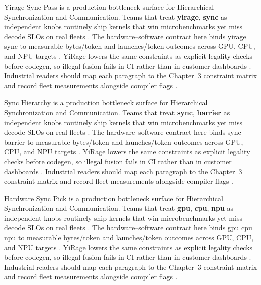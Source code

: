 Yirage Sync Pass is a production bottleneck surface for Hierarchical Synchronization and Communication. Teams that treat \textbf{yirage}, \textbf{sync} as independent knobs routinely ship kernels that win microbenchmarks yet miss decode SLOs on real fleets \citep{liu2024deepseekv3,memoryfloor2026}. The hardware--software contract here binds yirage sync to measurable bytes/token and launches/token outcomes across GPU, CPU, and NPU targets \citep{patel2025llminference,nvidia2022hopper}. YiRage lowers the same constraints as explicit legality checks before codegen, so illegal fusion fails in CI rather than in customer dashboards \citep{taxbreak2026,semianalysis2024tma}. Industrial readers should map each paragraph to the Chapter~3 constraint matrix and record fleet measurements alongside compiler flags \citep{memoryfloor2026,amd2024xdna}.

Sync Hierarchy is a production bottleneck surface for Hierarchical Synchronization and Communication. Teams that treat \textbf{sync}, \textbf{barrier} as independent knobs routinely ship kernels that win microbenchmarks yet miss decode SLOs on real fleets \citep{patel2025llminference,nvidia2022hopper}. The hardware--software contract here binds sync barrier to measurable bytes/token and launches/token outcomes across GPU, CPU, and NPU targets \citep{taxbreak2026,semianalysis2024tma}. YiRage lowers the same constraints as explicit legality checks before codegen, so illegal fusion fails in CI rather than in customer dashboards \citep{memoryfloor2026,amd2024xdna}. Industrial readers should map each paragraph to the Chapter~3 constraint matrix and record fleet measurements alongside compiler flags \citep{nvidia2022hopper,amd2024aie}.

Hardware Sync Pick is a production bottleneck surface for Hierarchical Synchronization and Communication. Teams that treat \textbf{gpu}, \textbf{cpu}, \textbf{npu} as independent knobs routinely ship kernels that win microbenchmarks yet miss decode SLOs on real fleets \citep{taxbreak2026,semianalysis2024tma}. The hardware--software contract here binds gpu cpu npu to measurable bytes/token and launches/token outcomes across GPU, CPU, and NPU targets \citep{memoryfloor2026,amd2024xdna}. YiRage lowers the same constraints as explicit legality checks before codegen, so illegal fusion fails in CI rather than in customer dashboards \citep{nvidia2022hopper,amd2024aie}. Industrial readers should map each paragraph to the Chapter~3 constraint matrix and record fleet measurements alongside compiler flags \citep{semianalysis2024tma,dlbook}.

